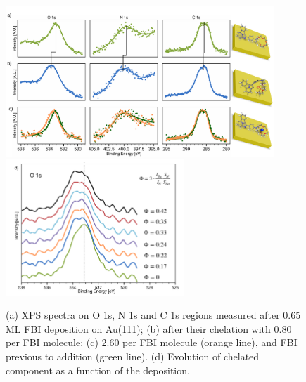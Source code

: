\documentclass[aps,prl,reprint,longbibliography,superscriptaddress, english]{revtex4-1}
\begin{document}
\begin{figure}[ht!]
	\includegraphics[width=0.9\textwidth]{figures/fig2a_xps_chelation.pdf}
	\includegraphics[width=0.6\textwidth]{figures/fig2_xps_chelation.2d).pdf}
	
	\caption{\label{XPS_FBI_Au(111)} 
    (a) XPS spectra on O 1s, N 1s and C 1s regions measured after 0.65 ML FBI deposition on Au(111); (b) after their chelation with 0.80 \Bapp per FBI molecule; (c) 2.60 \Nap per FBI molecule (orange line), and FBI previous to \Nap addition (green line). (d) Evolution of chelated component as a function of the \Bapp deposition.}
\end{figure}  
\end{document}
